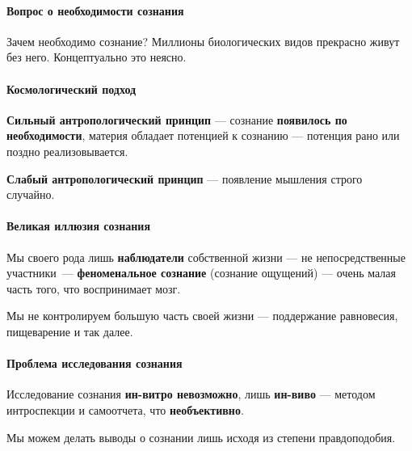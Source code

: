 \documentclass{article}
\begin{document}
\begin{flushleft}
\paragraph{Вопрос о необходимости сознания} Зачем необходимо сознание? Миллионы биологических видов прекрасно живут без него. Концептуально это неясно.

\paragraph{Космологический подход} \textbf{Сильный антропологический принцип} — сознание \textbf{появилось по необходимости}, материя обладает потенцией к сознанию — потенция рано или поздно реализовывается.

\textbf{Слабый антропологический принцип} — появление мышления строго случайно.

\paragraph{Великая иллюзия сознания} Мы своего рода лишь \textbf{наблюдатели} собственной жизни — не непосредственные участники — \textbf{феноменальное сознание} (сознание ощущений) — очень малая часть того, что воспринимает мозг.

Мы не контролируем большую часть своей жизни — поддержание равновесия, пищеварение и так далее.

\paragraph{Проблема исследования сознания} Исследование сознания \textbf{ин-витро невозможно}, лишь \textbf{ин-виво} — методом интроспекции и самоотчета, что \textbf{необъективно}.

Мы можем делать выводы о сознании лишь исходя из степени правдоподобия.

\end{flushleft}
\end{document}
